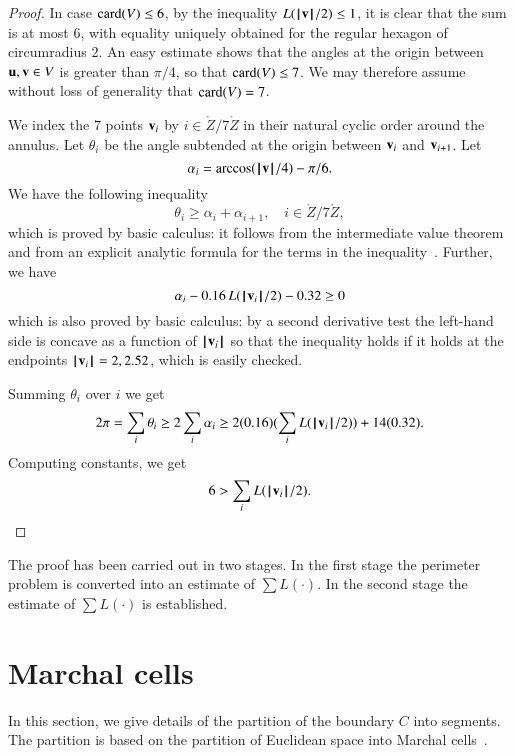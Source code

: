 \documentclass{llncs}
\begin{document}
\begin{proof}
In case ${\operatorname{card}}(V)\le 6$,
by the inequality $L({{\hskip0.1em|\hskip-0.15em|\hskip0.1em}{\mathbf v}{\hskip0.1em|\hskip-0.15em|\hskip0.1em}}/2)\le 1$,
 it is clear that the sum is at most $6$, with equality uniquely
obtained for the regular hexagon of circumradius $2$.  
An easy estimate shows that the angles at the origin between ${\mathbf u},{\mathbf v}\in V$ is greater than
$\pi/4$, so that ${\operatorname{card}}(V)\le 7$.  We may therefore assume without loss of generality 
that ${\operatorname{card}}(V)=7$.

We index the $7$ points ${\mathbf v}_i$ by $i\in\ring{Z}/7\ring{Z}$ in their
natural cyclic order around the annulus.  Let $\theta_i$ be the angle
subtended at the origin between ${\mathbf v}_i$ and ${\mathbf v}_{i+1}$.  Let 
\[
\alpha_i = \arccos({{\hskip0.1em|\hskip-0.15em|\hskip0.1em}{\mathbf v}{\hskip0.1em|\hskip-0.15em|\hskip0.1em}}/4) - \pi/6.
\]
We have the following inequality
\begin{equation}\label{eqn:theta-alpha}
\theta_i \ge \alpha_i + \alpha_{i+1},\quad i\in \ring{Z}/7\ring{Z},
\end{equation}
which is proved by basic calculus: it follows from the intermediate
value theorem and from an explicit analytic formula for the terms in
the inequality~\cite{DSP}.
Further, we have
\begin{equation}\label{eqn:alpha}
  \alpha_i - 0.16\, L({{\hskip0.1em|\hskip-0.15em|\hskip0.1em}{\mathbf v}_i{\hskip0.1em|\hskip-0.15em|\hskip0.1em}}/2) - 0.32 \ge0
\end{equation}
which is also proved by basic calculus: by a second derivative test the left-hand side
is concave as a function of  ${{\hskip0.1em|\hskip-0.15em|\hskip0.1em}{\mathbf v}_i{\hskip0.1em|\hskip-0.15em|\hskip0.1em}}$ so that the inequality holds if it holds at the
endpoints ${{\hskip0.1em|\hskip-0.15em|\hskip0.1em}{\mathbf v}_i{\hskip0.1em|\hskip-0.15em|\hskip0.1em}}=2,2.52$, which is easily checked.

Summing $\theta_i$ over $i$ we get
\[
2\pi  = \sum_i \theta_i \ge 2\sum_i \alpha_i \ge 2 (0.16) (\sum_i L({{\hskip0.1em|\hskip-0.15em|\hskip0.1em}{\mathbf v}_i{\hskip0.1em|\hskip-0.15em|\hskip0.1em}}/2)) + 14 (0.32).
\]
Computing constants, we get
\[
6 > \sum_i L({{\hskip0.1em|\hskip-0.15em|\hskip0.1em}{\mathbf v}_i{\hskip0.1em|\hskip-0.15em|\hskip0.1em}}/2).
\]
\end{proof}

\begin{remark}
The proof has been carried out in two stages.  In the first stage the perimeter problem is
converted into an estimate of $\sum L(\cdot)$.  In the second stage the estimate 
of $\sum L(\cdot)$ is established.
\end{remark}


\section{Marchal cells}

In this section, we give details of the partition of the boundary $C$
into segments.  The partition is based on the partition of Euclidean
space into Marchal cells~\cite{marchal:2009}.
\end{document}
